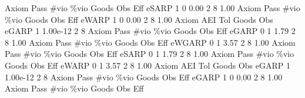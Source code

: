 {\smallskip}
{\smallskip}
{\smallskip}
       Axiom {\VBAR} Pass        \#vio        \%vio       Goods         Obs         Eff  
       eSARP {\VBAR}    1           0        0.00           2           8        1.00  
{\smallskip}
{\smallskip}
{\smallskip}
       Axiom {\VBAR} Pass        \#vio        \%vio       Goods         Obs         Eff  
       eWARP {\VBAR}    1           0        0.00           2           8        1.00  
{\smallskip}
       Axiom {\VBAR}       AEI        Tol      Goods        Obs 
       eGARP {\VBAR}         1   1.00e-12          2          8 
{\smallskip}
{\smallskip}
{\smallskip}
       Axiom {\VBAR} Pass        \#vio        \%vio       Goods         Obs         Eff  
       eGARP {\VBAR}    0           1        1.79           2           8        1.00  
{\smallskip}
{\smallskip}
{\smallskip}
       Axiom {\VBAR} Pass        \#vio        \%vio       Goods         Obs         Eff  
      eWGARP {\VBAR}    0           1        3.57           2           8        1.00  
{\smallskip}
{\smallskip}
{\smallskip}
       Axiom {\VBAR} Pass        \#vio        \%vio       Goods         Obs         Eff  
       eSARP {\VBAR}    0           1        1.79           2           8        1.00  
{\smallskip}
{\smallskip}
{\smallskip}
       Axiom {\VBAR} Pass        \#vio        \%vio       Goods         Obs         Eff  
       eWARP {\VBAR}    0           1        3.57           2           8        1.00  
{\smallskip}
       Axiom {\VBAR}       AEI        Tol      Goods        Obs 
       eGARP {\VBAR}         1   1.00e-12          2          8 
{\smallskip}
{\smallskip}
{\smallskip}
       Axiom {\VBAR} Pass        \#vio        \%vio       Goods         Obs         Eff  
       eGARP {\VBAR}    1           0        0.00           2           8        1.00  
{\smallskip}
{\smallskip}
{\smallskip}
       Axiom {\VBAR} Pass        \#vio        \%vio       Goods         Obs         Eff  
